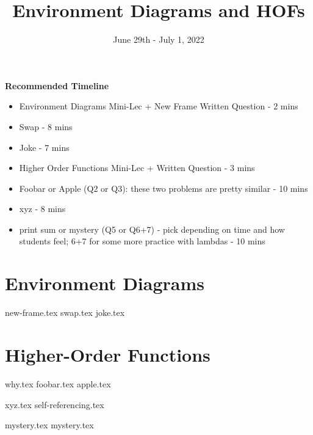 \documentclass{exam}
\title{Environment Diagrams and HOFs}
\date{June 29th - July 1, 2022}
\begin{document}
\maketitle


\begin{blocksection}
\begin{guide}
\textbf{Recommended Timeline}
\begin{itemize}
    \item Environment Diagrams Mini-Lec + New Frame Written Question - 2 mins
    \item Swap - 8 mins
    \item Joke - 7 mins
    \item Higher Order Functions Mini-Lec + Written Question - 3 mins
    \item Foobar or Apple (Q2 or Q3): these two problems are pretty similar - 10 mins
    \item xyz - 8 mins
    \item print sum or mystery (Q5 or Q6+7) - pick depending on time and how students feel;
    6+7 for some more practice with lambdas - 10 mins
\end{itemize}
\end{guide}
\end{blocksection}


\section{Environment Diagrams}
\begin{questions}
{new-frame.tex}
{swap.tex}
\newpage
{joke.tex}
\end{questions}

\newpage
\section{Higher-Order Functions}
\begin{questions}
{why.tex}
{foobar.tex}
{apple.tex}

\newpage
{xyz.tex}
{self-referencing.tex}

\newpage
{mystery.tex}
{mystery.tex}
\clearpage

\end{questions}
\end{document}
